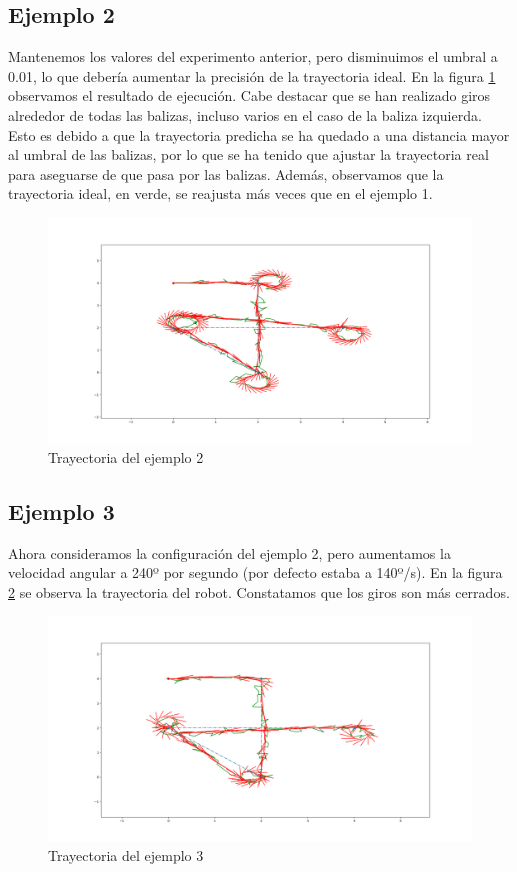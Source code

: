 \subsection{Ejemplo 2}
Mantenemos los valores del experimento anterior, pero disminuimos el umbral a 0.01, lo que debería aumentar la precisión de la trayectoria ideal. En la figura \ref{fig:localizacion_ej4} observamos el resultado de ejecución. Cabe destacar que se han realizado giros alrededor de todas las balizas, incluso varios en el caso de la baliza izquierda. Esto 
es debido a que la trayectoria predicha se ha quedado a una distancia mayor al umbral de las balizas, por lo que se ha tenido que ajustar la trayectoria real para aseguarse de que pasa por las balizas. Además, observamos que la trayectoria ideal, en verde, se reajusta más veces que en el ejemplo 1.
\begin{figure}[htb]
  \centering
  \includegraphics[width=1\linewidth]{images/localizacion10.png}
  \caption{Trayectoria del ejemplo 2}
  \label{fig:localizacion_ej4}
\end{figure}

\subsection{Ejemplo 3}
Ahora consideramos la configuración del ejemplo 2, pero aumentamos la velocidad angular a 240º por segundo (por defecto estaba a 140º/s). 
En la figura \ref{fig:localizacion_ej5} se observa la trayectoria del robot. Constatamos que los giros son más cerrados.

\begin{figure}[htb]
  \centering
  \includegraphics[width=1\linewidth]{images/localizacion11.png}
  \caption{Trayectoria del ejemplo 3}
  \label{fig:localizacion_ej5}
\end{figure}

